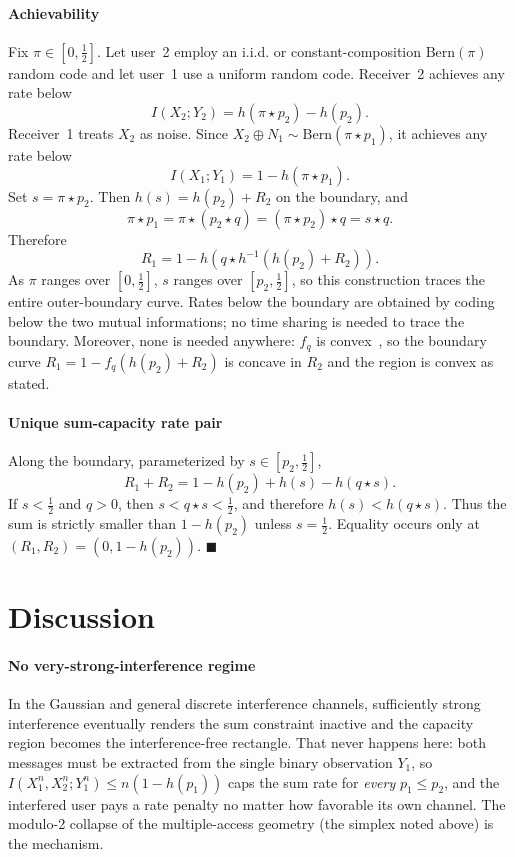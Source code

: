 \documentclass[12pt,draftclsnofoot,onecolumn,conference]{IEEEtran}
\newcommand{\st}{\star}
\begin{document}
\paragraph{Achievability}
Fix $\pi\in[0,\tfrac12]$. Let user~2 employ an i.i.d. or
constant-composition $\mathrm{Bern}(\pi)$ random code and let user~1 use a
uniform random code. Receiver~2 achieves any rate below
\[
I(X_2;Y_2)=h(\pi\st p_2)-h(p_2).
\]
Receiver~1 treats $X_2$ as noise. Since
$X_2\oplus N_1\sim\mathrm{Bern}(\pi\st p_1)$, it achieves any rate below
\[
I(X_1;Y_1)=1-h(\pi\st p_1).
\]
Set $s=\pi\st p_2$. Then
$h(s)=h(p_2)+R_2$ on the boundary, and
\[
\pi\st p_1
=\pi\st(p_2\st q)
=(\pi\st p_2)\st q
=s\st q.
\]
Therefore
\[
R_1=1-h\!\left(q\st h^{-1}(h(p_2)+R_2)\right).
\]
As $\pi$ ranges over $[0,\tfrac12]$, $s$ ranges over
$[p_2,\tfrac12]$, so this construction traces the entire outer-boundary
curve. Rates below the boundary are obtained by coding below the two mutual
informations; no time sharing is needed to trace the boundary. Moreover,
none is needed anywhere: $f_q$ is convex~\cite{WZ73a}, so the boundary curve
$R_1=1-f_q(h(p_2)+R_2)$ is concave in $R_2$ and the region is convex as
stated.

\paragraph{Unique sum-capacity rate pair}
Along the boundary, parameterized by $s\in[p_2,\tfrac12]$,
\[
R_1+R_2
=1-h(p_2)+h(s)-h(q\st s).
\]
If $s<\tfrac12$ and $q>0$, then
$s<q\st s<\tfrac12$, and therefore
$h(s)<h(q\st s)$. Thus the sum is strictly smaller than
$1-h(p_2)$ unless $s=\tfrac12$. Equality occurs only at
$(R_1,R_2)=(0,1-h(p_2))$.
\hfill$\blacksquare$

\section{Discussion}

\paragraph{No very-strong-interference regime}
In the Gaussian and general discrete interference channels, sufficiently
strong interference eventually renders the sum constraint inactive and the
capacity region becomes the interference-free rectangle. That never happens
here: both messages must be extracted from the single binary observation
$Y_1$, so $I(X_1^n,X_2^n;Y_1^n)\le n(1-h(p_1))$ caps the sum rate for
\emph{every} $p_1\le p_2$, and the interfered user pays a rate penalty no
matter how favorable its own channel. The modulo-2 collapse of the
multiple-access geometry (the simplex noted above) is the mechanism.
\end{document}

